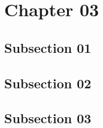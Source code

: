 \section{Chapter 03}
\subsection{Subsection 01}
\lipsum[1-5]
\subsection{Subsection 02}
\lipsum[1-5]
\subsection{Subsection 03}
\lipsum[1-5]
